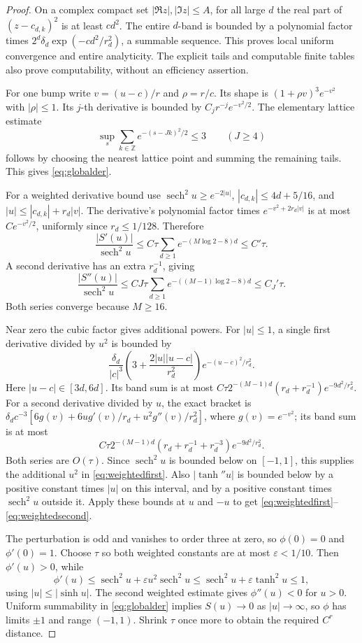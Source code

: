 \documentclass[11pt]{article}
\theoremstyle{remark}\newtheorem{remark}[theorem]{Remark}
\begin{document}
\begin{proof}
On a complex compact set $|\Re z|,|\Im z|\le A$, for all large
$d$ the real part of $(z-c_{d,k})^2$ is at least $c d^2$.
The entire $d$-band is bounded by a polynomial factor times
$2^d\delta_d\exp(-c d^2/r_d^2)$, a summable sequence. This
proves local uniform convergence and entire analyticity.
The explicit tails and computable finite tables also prove
computability, without an efficiency assertion.

For one bump write $v=(u-c)/r$ and $\rho=r/c$.
Its shape is $(1+\rho v)^3e^{-v^2}$ with $|\rho|\le1$.
Its $j$-th derivative is bounded by $C_jr^{-j}e^{-v^2/2}$.
The elementary lattice estimate
\[
 \sup_s\sum_{k\in\mathbb Z}e^{-(s-Jk)^2/2}\le3\qquad(J\ge4)
\]
follows by choosing the nearest lattice point and summing the
remaining tails. This gives \eqref{eq:globalder}.

For a weighted derivative bound use
$\operatorname{sech}^2u\ge e^{-2|u|}$,
$|c_{d,k}|\le4d+5/16$, and
$|u|\le|c_{d,k}|+r_d|v|$.
The derivative's polynomial factor times
$e^{-v^2+2r_d|v|}$ is at most $Ce^{-v^2/2}$, uniformly
since $r_d\le1/128$. Therefore
\[
 \frac{|S'(u)|}{\operatorname{sech}^2u}
 \le C\tau\sum_{d\ge1}e^{-(M\log2-8)d}\le C'\tau.
\]
A second derivative has an extra $r_d^{-1}$, giving
\[
 \frac{|S''(u)|}{\operatorname{sech}^2u}
 \le CJ\tau\sum_{d\ge1}e^{-((M-1)\log2-8)d}\le C_J'\tau.
\]
Both series converge because $M\ge16$.

Near zero the cubic factor gives additional powers.
For $|u|\le1$, a single first derivative divided by $u^2$
is bounded by
\[
 \frac{\delta_d}{|c|^3}
 \left(3+\frac{2|u||u-c|}{r_d^2}\right)e^{-(u-c)^2/r_d^2}.
\]
Here $|u-c|\in[3d,6d]$. Its band sum is at most
$C\tau2^{-(M-1)d}(r_d+r_d^{-1})e^{-9d^2/r_d^2}$.
For a second derivative divided by $u$, the exact bracket is
$\delta_dc^{-3}[6g(v)+6ug'(v)/r_d+u^2g''(v)/r_d^2]$,
where $g(v)=e^{-v^2}$; its band sum is at most
\[
 C\tau2^{-(M-1)d}
   (r_d+r_d^{-1}+r_d^{-3})e^{-9d^2/r_d^2}.
\]
Both series are $O(\tau)$. Since $\operatorname{sech}^2u$
is bounded below on $[-1,1]$, this supplies the additional
$u^2$ in \eqref{eq:weightedfirst}.
Also $|\tanh''u|$ is bounded below by a positive constant
times $|u|$ on this interval, and by a positive constant
times $\operatorname{sech}^2u$ outside it.
Apply these bounds at $u$ and $-u$ to get
\eqref{eq:weightedfirst}--\eqref{eq:weightedsecond}.

The perturbation is odd and vanishes to order three at zero,
so $\phi(0)=0$ and $\phi'(0)=1$.
Choose $\tau$ so both weighted constants are at most
$\varepsilon<1/10$. Then $\phi'(u)>0$, while
\[
 \phi'(u)\le\operatorname{sech}^2u+
       \varepsilon u^2\operatorname{sech}^2u
 \le\operatorname{sech}^2u+\varepsilon\tanh^2u\le1,
\]
using $|u|\le|\sinh u|$.
The second weighted estimate gives $\phi''(u)<0$ for $u>0$.
Uniform summability in \eqref{eq:globalder} implies
$S(u)\to0$ as $|u|\to\infty$, so $\phi$ has limits $\pm1$
and range $(-1,1)$. Shrink $\tau$ once more to obtain the
required $C^r$ distance.
\end{proof}
\end{document}
